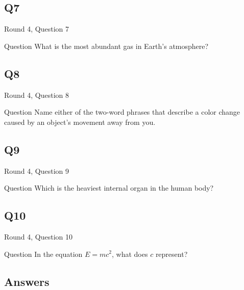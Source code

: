 \documentclass[11pt]{beamer}
\begin{document}
\subsection*{Q7}
\begin{frame}[t]{Round 4, Question 7}
\vspace{0.5em}
\begin{block}{Question}
What is the most abundant gas in Earth's atmosphere?
\end{block}
\end{frame}
    

\subsection*{Q8}
\begin{frame}[t]{Round 4, Question 8}
\vspace{0.5em}
\begin{block}{Question}
Name either of the two-word phrases that describe a color change caused by an object's movement away from you.
\end{block}
\end{frame}
    

\subsection*{Q9}
\begin{frame}[t]{Round 4, Question 9}
\vspace{0.5em}
\begin{block}{Question}
Which is the heaviest internal organ in the human body?
\end{block}
\end{frame}
    

\subsection*{Q10}
\begin{frame}[t]{Round 4, Question 10}
\vspace{0.5em}
\begin{block}{Question}
In the equation \(E=mc^2\), what does \(c\) represent?
\end{block}
\end{frame}
    
\subsection{Answers}
\end{document}
